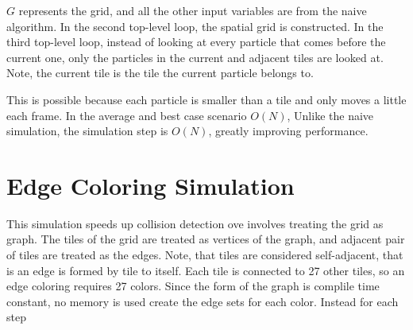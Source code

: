\indent \indent $G$ represents the grid, and all the other
input variables are from the naive algorithm.
In the second top-level loop, the spatial grid is constructed.
In the third top-level loop, instead of looking at every
particle that comes before the current one, only the particles
in the current and adjacent tiles are looked at. 
Note, the current tile is the tile the current particle belongs to.

This is possible because each particle is smaller than a tile
and only moves a little each frame. In the average and
best case scenario $O(N)$, 
Unlike the
naive simulation, the simulation step is $O(N)$, greatly improving
performance.

\section{Edge Coloring Simulation}
This simulation speeds up collision detection ove
involves treating the grid as graph.
The tiles of the grid are treated as vertices of the graph,
and adjacent pair of tiles are treated as the edges. 
Note, that tiles are considered self-adjacent, that is an edge
is formed by tile to itself. Each tile is connected to
27 other tiles, so an edge coloring requires 27 colors.
Since the form of the graph is complile time constant,
no memory is used create the edge sets for each color. 
Instead for each step 


\vspace{-0.4em} %



